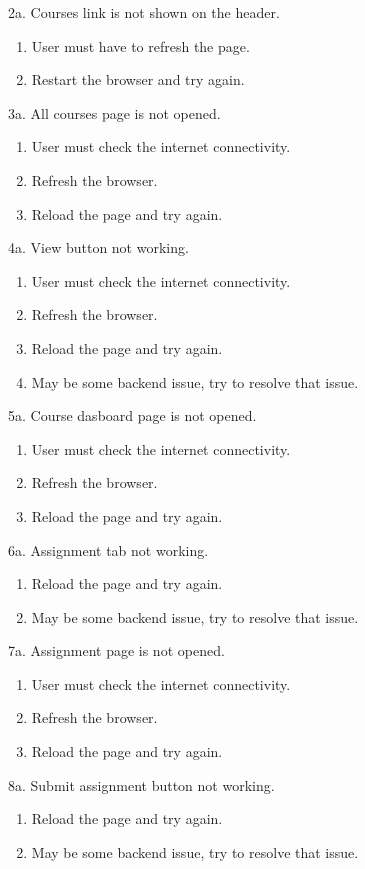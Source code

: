 \documentclass[12pt]{article}
\begin{document}
\newpage
2a. Courses link is not shown on the header.
\begin{enumerate}
\item User must have to refresh the page.
\item Restart the browser and try again.
\end{enumerate} 
3a. All courses page is not opened.
\begin{enumerate}
\item User must check the internet connectivity.
\item Refresh the browser.
\item Reload the page and try again.
\end{enumerate}
4a. View button not working.
\begin{enumerate}
\item User must check the internet connectivity.
\item Refresh the browser.
\item Reload the page and try again.
\item May be some backend issue, try to resolve that issue.
\end{enumerate}
5a. Course dasboard page is not opened.
\begin{enumerate}
\item User must check the internet connectivity.
\item Refresh the browser.
\item Reload the page and try again.
\end{enumerate}
6a. Assignment tab not working.
\begin{enumerate}
\item Reload the page and try again.
\item May be some backend issue, try to resolve that issue.
\end{enumerate}
\newpage
7a. Assignment page is not opened.
\begin{enumerate}
\item User must check the internet connectivity.
\item Refresh the browser.
\item Reload the page and try again.
\end{enumerate}
8a. Submit assignment button not working.
\begin{enumerate}
\item Reload the page and try again.
\item May be some backend issue, try to resolve that issue.
\end{enumerate}
\end{document}
